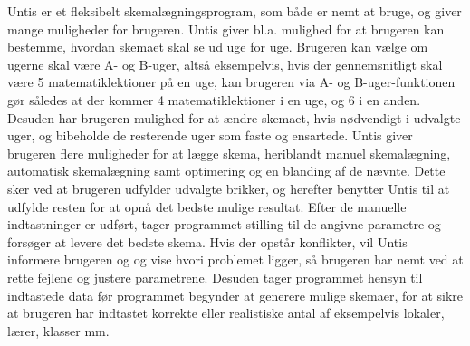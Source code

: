 Untis er et fleksibelt skemalægningsprogram, som både er nemt at bruge, og giver mange muligheder for brugeren. Untis giver bl.a. mulighed for at brugeren kan bestemme, hvordan skemaet skal se ud uge for uge. Brugeren kan vælge om ugerne skal være A- og B-uger, altså eksempelvis, hvis der gennemsnitligt skal være 5 matematiklektioner på en uge, kan brugeren via A- og B-uger-funktionen gør således at der kommer 4 matematiklektioner i en uge, og 6 i en anden. Desuden har brugeren mulighed for at ændre skemaet, hvis nødvendigt i udvalgte uger, og bibeholde de resterende uger som faste og ensartede. 
Untis giver brugeren flere muligheder for at lægge skema, heriblandt manuel skemalægning, automatisk skemalægning samt optimering og en blanding af de nævnte. Dette sker ved at brugeren udfylder udvalgte brikker, og herefter benytter Untis til at udfylde resten for at opnå det bedste mulige resultat. Efter de manuelle indtastninger er udført, tager programmet stilling til de angivne parametre og forsøger at levere det bedste skema. Hvis der opstår konflikter, vil Untis informere brugeren og og vise hvori problemet ligger, så brugeren har nemt ved at rette fejlene og justere parametrene. Desuden tager programmet hensyn til indtastede data før programmet begynder at generere mulige skemaer, for at sikre at brugeren har indtastet korrekte eller realistiske antal af eksempelvis lokaler, lærer, klasser mm\cite{untis2016}.
